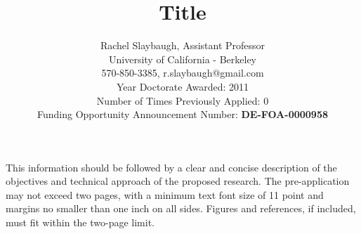 \documentclass[11pt,twoside]{article}
\title{Title}
\author{Rachel Slaybaugh, Assistant Professor\\
University of California - Berkeley\\
570-850-3385, r.slaybaugh@gmail.com\\
Year Doctorate Awarded: 2011\\
Number of Times Previously Applied: 0\\
Funding Opportunity Announcement Number: \textbf{DE-FOA-0000958}}
\begin{document}
\maketitle
 
This information should be followed by a clear and concise description of the objectives and
technical approach of the proposed research. The pre-application may not exceed two pages,
with a minimum text font size of 11 point and margins no smaller than one inch on all sides.
Figures and references, if included, must fit within the two-page limit.
\end{document}
